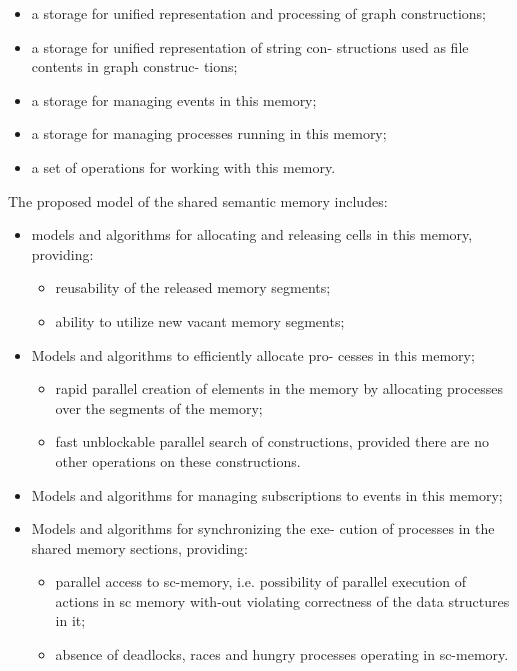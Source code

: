 ﻿\documentclass[a4paper]{article}
\begin{document}
\begin{multicols}{2}
\begin{itemize}
    \item  a storage for unified representation and processing
of graph constructions;
\item a storage for unified representation of string con-
structions used as file contents in graph construc-
tions;
\item a storage for managing events in this memory;
\item a storage for managing processes running in this
memory;
\item a set of operations for working with this memory.
\end{itemize}
The proposed model of the shared semantic memory
includes:
\begin{itemize}
    \item models and algorithms for allocating and releasing
cells in this memory, providing:
    \begin{itemize}
        \item reusability of the released memory segments;
        \item ability to utilize new vacant memory segments;
    \end{itemize}
    \item Models and algorithms to efficiently allocate pro-
cesses in this memory;
    \begin{itemize}
        \item rapid parallel creation of elements in the memory
by allocating processes over the segments of the
memory;
        \item fast unblockable parallel search of constructions,
provided there are no other operations on these
constructions.
    \end{itemize}
    \item Models and algorithms for managing subscriptions
to events in this memory;
    \item Models and algorithms for synchronizing the exe-
cution of processes in the shared memory sections,
providing:
    \begin{itemize}
        \item parallel access to sc-memory, i.e. possibility of parallel execution of actions in sc memory with-out violating correctness of the data structures in it;
        \item absence of deadlocks, races and hungry processes operating in sc-memory.
    \end{itemize}
\end{itemize}

\end{multicols}
\end{document}
